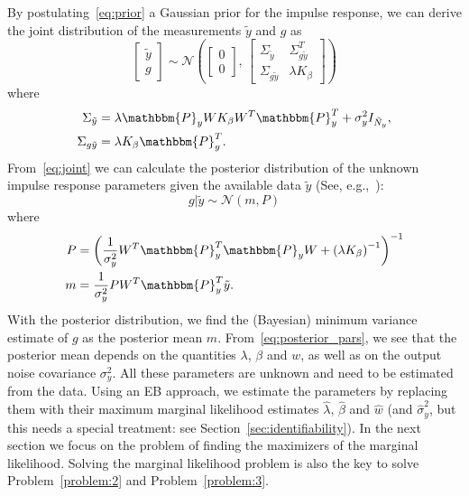 \documentclass[10pt]{article}
\renewcommand{\P}{\mathbbm{P}}
\newcommand{\rmatrix}[1]{\begin{bmatrix}#1\end{bmatrix}}
\begin{document}
By postulating~\eqref{eq:prior}  a Gaussian prior for the impulse response, we can
derive the joint distribution of the measurements $\tilde y$ and $g$ as
\begin{equation}\label{eq:joint}
  \rmatrix{\tilde y\\g}\sim \mathcal N \left( \rmatrix{0\\0},\,
  \rmatrix {\Sigma_{\tilde y} & \Sigma_{g\tilde y}^T \\ \Sigma_{g\tilde y} & \lambda K_\beta} \right)
\end{equation}
where
\begin{equation}
  \begin{split}
    \Sigma_{\tilde y} &= \lambda \P_y W K_\beta W^T \P_y^T + \sigma_y^2 I_{\tilde N_y}, \\
    \Sigma_{g\tilde y} & = \lambda K_\beta \P_y^T.
  \end{split}
\end{equation}
From~\eqref{eq:joint} we can calculate the posterior distribution of the unknown
impulse response parameters given the available data $\tilde y$ (See, e.g.,~\cite[App. B.7]{soederstroem1981identification}):
\begin{equation}\label{eq:posterior}
g|\tilde y\sim \mathcal N (m, P)
\end{equation}
where
\begin{equation}
  \begin{split}\label{eq:posterior_pars}
    P &= {\left( \frac{1}{\sigma_y^2}W^T\P_y^T\P_y W + {(\lambda
K_\beta)}^{-1}\right)}^{-1}\\
    m &= \frac{1}{\sigma_y^2}P W^T\P_y^T \tilde y.
  \end{split}
\end{equation}
With the posterior distribution, we find the (Bayesian) minimum variance
estimate of $g$ as the posterior mean $m$.
From~\eqref{eq:posterior_pars}, we see that the posterior mean depends on the quantities
$\lambda$, $\beta$ and $w$, as well as on the output noise covariance
$\sigma_y^2$. All these parameters are unknown and need to be estimated from the data. Using an
EB approach, we estimate the parameters by replacing them with their maximum
marginal likelihood
estimates $\hat\lambda$, $\hat\beta$ and $\hat w$ (and $\hat \sigma_y^2$, but
this needs a special treatment: see Section~\ref{sec:identifiability}). In the
next section we focus on the problem of finding the maximizers
of the marginal likelihood. Solving the marginal likelihood problem is also the key to solve
Problem~\ref{problem:2} and Problem~\ref{problem:3}.
\end{document}
